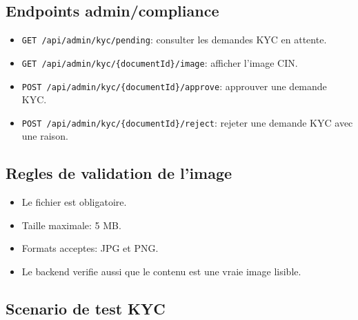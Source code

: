 \documentclass[12pt,a4paper]{article}
\begin{document}
\subsection{Endpoints admin/compliance}

\begin{itemize}
    \item \texttt{GET /api/admin/kyc/pending}: consulter les demandes KYC en attente.
    \item \texttt{GET /api/admin/kyc/\{documentId\}/image}: afficher l'image CIN.
    \item \texttt{POST /api/admin/kyc/\{documentId\}/approve}: approuver une demande KYC.
    \item \texttt{POST /api/admin/kyc/\{documentId\}/reject}: rejeter une demande KYC avec une raison.
\end{itemize}

\subsection{Regles de validation de l'image}

\begin{itemize}
    \item Le fichier est obligatoire.
    \item Taille maximale: 5 MB.
    \item Formats acceptes: JPG et PNG.
    \item Le backend verifie aussi que le contenu est une vraie image lisible.
\end{itemize}

\subsection{Scenario de test KYC}
\end{document}
